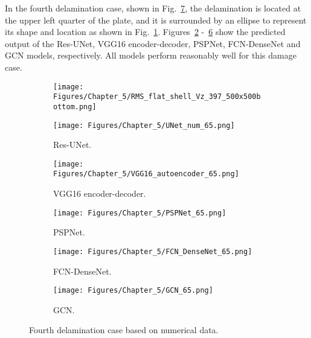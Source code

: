 In the fourth delamination case, shown in Fig.~\ref{fig:rms_fourth_case}, the delamination is located at the upper left quarter of the plate, and it is surrounded by an ellipse to represent its shape and location as shown in Fig.~\ref{fig:RMS_bottom_397}.
Figures~\ref{fig:unet_65} -~\ref{fig:gcn_65} show the predicted output of the Res-UNet, VGG16 encoder-decoder, PSPNet, FCN-DenseNet and GCN models, respectively. 
All models perform reasonably well for this damage case.
\begin{figure} [!h]
	\centering
	\begin{subfigure}[b]{.48\textwidth}
		\centering
		\texttt{[image: Figures/Chapter\_5/RMS\_flat\_shell\_Vz\_397\_500x500bottom.png]}
		\caption{}
		\label{fig:RMS_bottom_397}
	\end{subfigure}
	\hfill
	\begin{subfigure}[b]{.48\textwidth}
		\centering
		\texttt{[image: Figures/Chapter\_5/UNet\_num\_65.png]}
		\caption{Res-UNet.}
		\label{fig:unet_65}	
	\end{subfigure}
	\hfill
	\begin{subfigure}[b]{.48\textwidth}
		\centering
		\texttt{[image: Figures/Chapter\_5/VGG16\_autoencoder\_65.png]}
		\caption{VGG16 encoder-decoder.}
		\label{fig:vgg16_65}
	\end{subfigure}
	\hfill
	\begin{subfigure}[b]{.48\textwidth}
		\centering
		\texttt{[image: Figures/Chapter\_5/PSPNet\_65.png]}
		\caption{PSPNet.}
		\label{fig:pspnet_65}	
	\end{subfigure}
	\hfill
	\begin{subfigure}[b]{.48\textwidth}
		\centering
		\texttt{[image: Figures/Chapter\_5/FCN\_DenseNet\_65.png]}
		\caption{FCN-DenseNet.}
		\label{fig:densenet_65}
	\end{subfigure}
	\hfill
	\begin{subfigure}[b]{.48\textwidth}
		\centering
		\texttt{[image: Figures/Chapter\_5/GCN\_65.png]}
		\caption{GCN.}
		\label{fig:gcn_65}	
	\end{subfigure}
	\caption{Fourth delamination case based on numerical data.}
	\label{fig:rms_fourth_case}
\end{figure}
\clearpage

